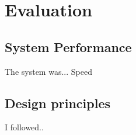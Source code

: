 \section{Evaluation}
\label{sec:evaluation}

\subsection{System Performance}
\label{subsec:system_performance}

The system was...
Speed

\subsection{Design principles}
\label{subsec:design_principles}

I followed..